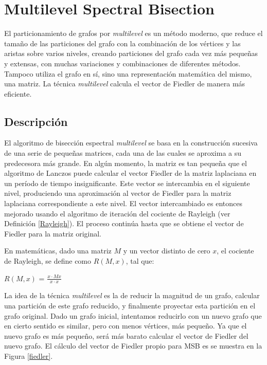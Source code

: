 \section{Multilevel Spectral Bisection}\label{Multilevel-Spectral-Bisection}

El particionamiento de grafos por \textit{multilevel} es un método moderno, que reduce el tamaño de las particiones del grafo con la combinación de los vértices y las aristas sobre varios niveles, creando particiones del grafo cada vez más pequeñas y extensas, con muchas variaciones y combinaciones de diferentes métodos. Tampoco utiliza el grafo en sí, sino una representación matemática del mismo, una matriz. La técnica \textit{multilevel} calcula el vector de Fiedler\cite{Fiedler} de manera más eficiente.

\subsection{Descripción}\label{msb_description}

El algoritmo de bisección espectral \textit{multilevel} se basa en la construcción sucesiva de una serie de pequeñas matrices, cada una de las cuales se aproxima a su predecesora más grande. En algún momento, la matriz es tan pequeña que el algoritmo de Lanczos\cite{Lanczos} puede calcular el vector Fiedler\cite{Fiedler} de la matriz laplaciana en un período de tiempo insignificante. Este vector se intercambia en el siguiente nivel, produciendo una aproximación al vector de Fiedler para la matriz laplaciana correspondiente a este nivel. El vector intercambiado es entonces mejorado usando el algoritmo de iteración del cociente de Rayleigh (ver Definición \ref{Rayleigh}). El proceso continúa hasta que se obtiene el vector de Fiedler para la matriz original.

\begin{mydef}\label{Rayleigh}
	En matemáticas, dado una matriz $M$ y un vector distinto de cero $x$, el cociente de Rayleigh, se define como $R(M, x)$, tal que:
	\begin{center}
		$R(M, x)$ = $\frac{x \cdot Mx}{x \cdot x}$
	\end{center}
\end{mydef}

La idea de la técnica \textit{multilevel} es la de reducir la magnitud de un grafo, calcular una partición de este grafo reducido, y finalmente proyectar esta partición en el grafo original. Dado un grafo inicial, intentamos reducirlo con un nuevo grafo que en cierto sentido es similar, pero con menos vértices, más pequeño. Ya que el nuevo grafo es más pequeño, será más barato calcular el vector de Fiedler del nuevo grafo. El cálculo del vector de Fiedler propio para MSB es se muestra en la Figura \ref{fiedler}.


